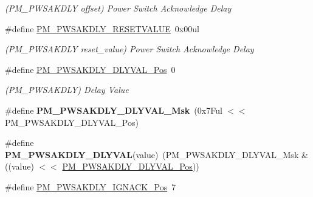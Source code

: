 \begin{DoxyCompactItemize}
\begin{DoxyCompactList}\small\item\em (P\+M\+\_\+\+P\+W\+S\+A\+K\+D\+L\+Y offset) Power Switch Acknowledge Delay \end{DoxyCompactList}\item 
\hypertarget{group___s_a_m_l21___p_m_gab7eb4f5579cf6c78d5780e3fd703e98d}{}\#define \hyperlink{group___s_a_m_l21___p_m_gab7eb4f5579cf6c78d5780e3fd703e98d}{P\+M\+\_\+\+P\+W\+S\+A\+K\+D\+L\+Y\+\_\+\+R\+E\+S\+E\+T\+V\+A\+L\+U\+E}~0x00ul\label{group___s_a_m_l21___p_m_gab7eb4f5579cf6c78d5780e3fd703e98d}

\begin{DoxyCompactList}\small\item\em (P\+M\+\_\+\+P\+W\+S\+A\+K\+D\+L\+Y reset\+\_\+value) Power Switch Acknowledge Delay \end{DoxyCompactList}\item 
\hypertarget{group___s_a_m_l21___p_m_ga161c5ac97a5a4695c56eb9e5d99454ed}{}\#define \hyperlink{group___s_a_m_l21___p_m_ga161c5ac97a5a4695c56eb9e5d99454ed}{P\+M\+\_\+\+P\+W\+S\+A\+K\+D\+L\+Y\+\_\+\+D\+L\+Y\+V\+A\+L\+\_\+\+Pos}~0\label{group___s_a_m_l21___p_m_ga161c5ac97a5a4695c56eb9e5d99454ed}

\begin{DoxyCompactList}\small\item\em (P\+M\+\_\+\+P\+W\+S\+A\+K\+D\+L\+Y) Delay Value \end{DoxyCompactList}\item 
\hypertarget{group___s_a_m_l21___p_m_gaedf7554a925ba9ada847c946ce1f2be1}{}\#define {\bfseries P\+M\+\_\+\+P\+W\+S\+A\+K\+D\+L\+Y\+\_\+\+D\+L\+Y\+V\+A\+L\+\_\+\+Msk}~(0x7\+Ful $<$$<$ P\+M\+\_\+\+P\+W\+S\+A\+K\+D\+L\+Y\+\_\+\+D\+L\+Y\+V\+A\+L\+\_\+\+Pos)\label{group___s_a_m_l21___p_m_gaedf7554a925ba9ada847c946ce1f2be1}

\item 
\hypertarget{group___s_a_m_l21___p_m_gad14cac0eac25cbcc9cadc23798592bca}{}\#define {\bfseries P\+M\+\_\+\+P\+W\+S\+A\+K\+D\+L\+Y\+\_\+\+D\+L\+Y\+V\+A\+L}(value)~(P\+M\+\_\+\+P\+W\+S\+A\+K\+D\+L\+Y\+\_\+\+D\+L\+Y\+V\+A\+L\+\_\+\+Msk \& ((value) $<$$<$ \hyperlink{group___s_a_m_l21___p_m_ga161c5ac97a5a4695c56eb9e5d99454ed}{P\+M\+\_\+\+P\+W\+S\+A\+K\+D\+L\+Y\+\_\+\+D\+L\+Y\+V\+A\+L\+\_\+\+Pos}))\label{group___s_a_m_l21___p_m_gad14cac0eac25cbcc9cadc23798592bca}

\item 
\hypertarget{group___s_a_m_l21___p_m_gad9f7ff35a1092e97c24b88a8ec82b692}{}\#define \hyperlink{group___s_a_m_l21___p_m_gad9f7ff35a1092e97c24b88a8ec82b692}{P\+M\+\_\+\+P\+W\+S\+A\+K\+D\+L\+Y\+\_\+\+I\+G\+N\+A\+C\+K\+\_\+\+Pos}~7\label{group___s_a_m_l21___p_m_gad9f7ff35a1092e97c24b88a8ec82b692}


\end{DoxyCompactItemize}
